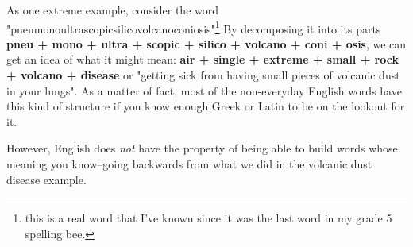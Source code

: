 As one extreme example, consider the word "pneumonoultrascopicsilicovolcanoconiosis"\footnote{this is a real word that
I've known since it was the last word in my grade 5 spelling bee.} By decomposing it into its parts \textbf{pneu + mono
+ ultra + scopic + silico + volcano + coni + osis}, we can get an idea of what it might mean: \textbf{air + single +
extreme + small + rock + volcano + disease} or "getting sick from having small pieces of volcanic dust in your lungs".
As a matter of fact, most of the non-everyday English words have this kind of structure if you know enough Greek or
Latin to be on the lookout for it.

However, English does \textit{not} have the property of being able to build words whose meaning you know--going
backwards from what we did in the volcanic dust disease example.

